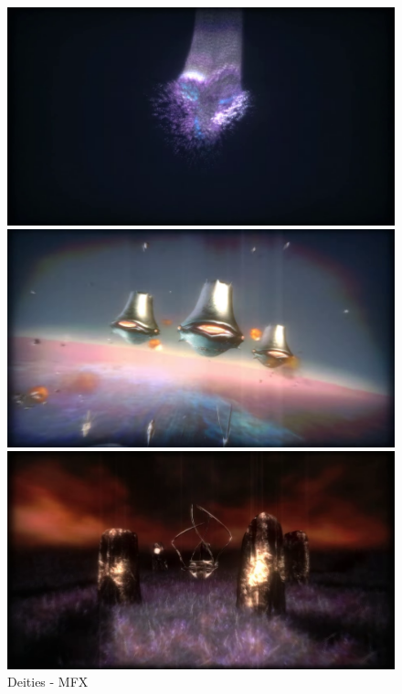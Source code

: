 \begin{figure}[h]
  \begin{minipage}[b]{0.30\linewidth}
    \centering
    \includegraphics[width=\linewidth]{images/demoscene/demos/deities1.png}
  \end{minipage}
  \hfill
  \begin{minipage}[b]{0.30\linewidth}
    \centering
    \includegraphics[width=\linewidth]{images/demoscene/demos/deities2.png}
  \end{minipage}
  \hfill
  \begin{minipage}[b]{0.30\linewidth}
    \centering
    \includegraphics[width=\linewidth]{images/demoscene/demos/deities3.png}
  \end{minipage}
  \caption{Deities - MFX}
  \label{deities}
\end{figure}


